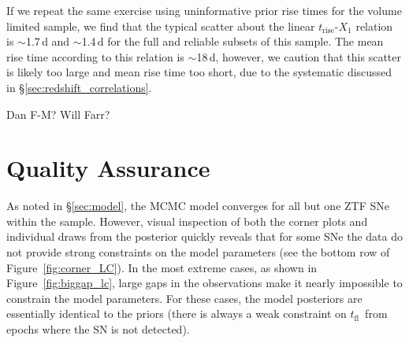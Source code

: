 \documentclass[twocolumn]{./aastex63}
\newcommand{\tfl}{$t_\mathrm{fl}$}
\newcommand{\trise}{$t_\mathrm{rise}$}
\begin{document}
If we repeat the same exercise using uninformative prior rise times for the
volume limited sample, we find that the typical scatter about the linear
\trise-$X_1$ relation is $\sim$1.7\,d and $\sim$1.4\,d for the full and reliable
subsets of this sample. The mean rise time according to this relation is
$\sim$18\,d, however, we caution that this scatter is likely too large and mean
rise time too short, due to the systematic discussed in
\S\ref{sec:redshift_correlations}.

\acknowledgements

Dan F-M? Will Farr?



\appendix

\section{Quality Assurance}\label{sec:qa}

As noted in \S\ref{sec:model}, the MCMC model converges for all but one ZTF
SNe within the sample. However, visual inspection of both the corner plots and
individual draws from the posterior quickly reveals that for some SNe the data
do not provide strong constraints on the model parameters (see the bottom row
of Figure~\ref{fig:corner_LC}). In the most extreme cases, as shown in
Figure~\ref{fig:biggap_lc}, large gaps in the observations make it nearly
impossible to constrain the model parameters. For these cases, the model
posteriors are essentially identical to the priors (there is always a weak
constraint on \tfl\ from epochs where the SN is not detected).
\end{document}
